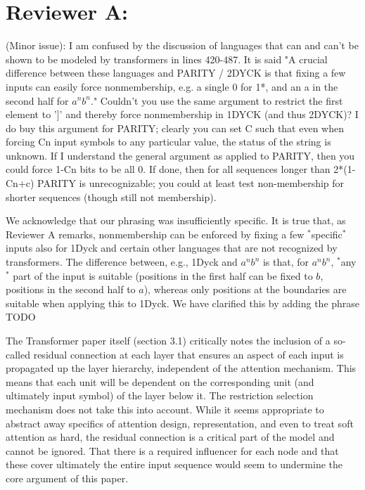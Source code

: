 \documentclass[11pt,a4paper]{article}
\newcommand\response[1]{{\color{blue}#1}}
\begin{document}
\section{Reviewer A:}

(Minor issue): I am confused by the discussion of languages that can and
can't be
shown to be modeled by transformers in lines 420-487. It is said "A
crucial difference between these languages and PARITY / 2DYCK is that
fixing a few inputs can easily force nonmembership, e.g. a single 0
for 1*, and an a in the second half for $a^n b^n$." Couldn't you use the
same argument to restrict the first element to ']' and thereby force
nonmembership in 1DYCK (and thus 2DYCK)? I do buy this
argument for PARITY; clearly you can set C such that even when forcing
Cn input symbols to any particular value, the status of the string is
unknown. If I understand the general argument as applied to PARITY,
then you could force 1-Cn bits to be all 0. If done, then for all
sequences longer than 2*(1-Cn+c) PARITY is unrecognizable; you could
at least test non-membership for shorter sequences (though still not
membership).

\response{We acknowledge that our phrasing was insufficiently specific. It is true that, as Reviewer A remarks, nonmembership can be enforced by fixing a few $^*$specific$^*$ inputs also for 1Dyck and certain other languages that are not recognized by transformers. The difference between, e.g., 1Dyck and $a^nb^n$ is that, for $a^nb^n$, $^*$any$^*$ part of the input is suitable (positions in the first half can be fixed to $b$, positions in the second half to $a$), whereas only positions at the boundaries are suitable when applying this to 1Dyck. We have clarified this by adding the phrase TODO}


The Transformer paper itself (section 3.1) critically notes the
inclusion of a so-called residual connection
at each layer that ensures an aspect of each input is propagated up the
layer
hierarchy, independent of the attention mechanism. This means that
each unit will be dependent on the corresponding unit (and ultimately
input symbol) of the layer below it. The restriction selection
mechanism does not take this into account. While it seems appropriate to
abstract away specifics of attention design, representation, and even
to treat soft attention as hard, the residual connection is a critical part
of the model and cannot be ignored. That there is a required
influencer for each node and that these cover ultimately the entire
input sequence would seem to undermine the core argument of this paper.
\end{document}
